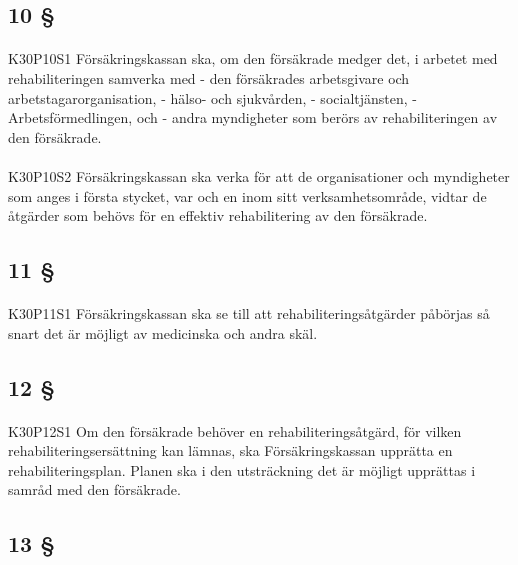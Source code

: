 \documentclass[a4paper,notitlepage,openany,10pt]{book}
\begin{document}
\subsection*{10 §}
\paragraph*{}
{\tiny K30P10S1}
Försäkringskassan ska, om den försäkrade medger det, i arbetet med rehabiliteringen samverka med
\newline - den försäkrades arbetsgivare och arbetstagarorganisation,
\newline - hälso- och sjukvården,
\newline - socialtjänsten,
\newline - Arbetsförmedlingen, och
\newline - andra myndigheter som berörs av rehabiliteringen av den försäkrade.
\paragraph*{}
{\tiny K30P10S2}
Försäkringskassan ska verka för att de organisationer och myndigheter som anges i första stycket, var och en inom sitt verksamhetsområde, vidtar de åtgärder som behövs för en effektiv rehabilitering av den försäkrade.
\subsection*{11 §}
\paragraph*{}
{\tiny K30P11S1}
Försäkringskassan ska se till att rehabiliteringsåtgärder påbörjas så snart det är möjligt av medicinska och andra skäl.
\subsection*{12 §}
\paragraph*{}
{\tiny K30P12S1}
Om den försäkrade behöver en rehabiliteringsåtgärd, för vilken rehabiliteringsersättning kan lämnas, ska Försäkringskassan upprätta en rehabiliteringsplan. Planen ska i den utsträckning det är möjligt upprättas i samråd med den försäkrade.
\subsection*{13 §}
\end{document}
